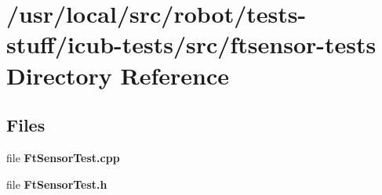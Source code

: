 \section{/usr/local/src/robot/tests-\/stuff/icub-\/tests/src/ftsensor-\/tests Directory Reference}
\label{dir_ae814844969255f68c24a1227446d595}
\subsection*{Files}
\begin{DoxyCompactItemize}
\item 
file {\bfseries Ft\-Sensor\-Test.\-cpp}
\item 
file {\bfseries Ft\-Sensor\-Test.\-h}
\end{DoxyCompactItemize}
